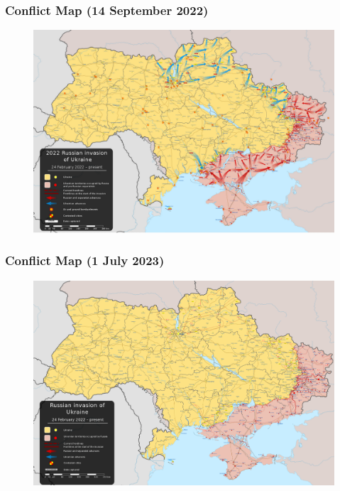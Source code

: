 \documentclass{beamer}
\begin{document}
\begin{frame} 
	\frametitle{\LARGE{Conflict Map (14 September 2022)}}
	\begin{figure}[ht!]
		\centering
		\includegraphics[width=\textwidth,height=\textheight, keepaspectratio]{14sept2022ukraine.png}
	\end{figure}
\end{frame}

\begin{frame} 
	\frametitle{\LARGE{Conflict Map (1 July 2023)}}
	\begin{figure}[ht!]
		\centering
		\includegraphics[width=\textwidth,height=\textheight, keepaspectratio]{1july2023ukraine.png}
	\end{figure}
\end{frame}
\end{document}
